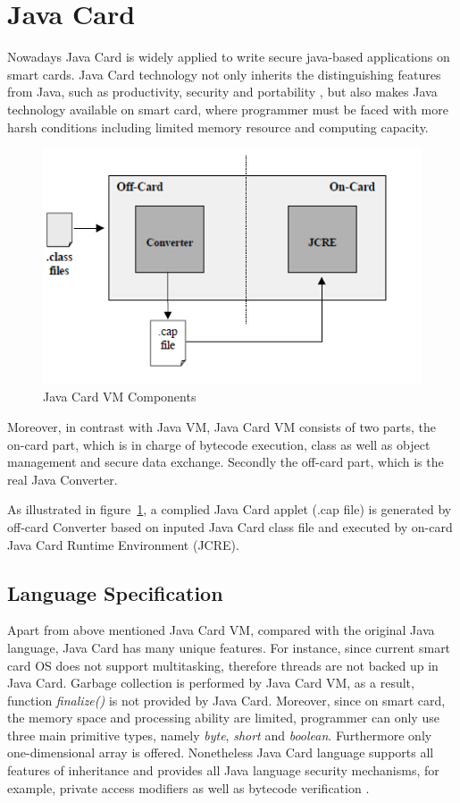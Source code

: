 \section{Java Card} \label{secJAVACARD}
Nowadays Java Card is widely applied to write secure java-based applications on smart cards. Java Card technology not only inherits the distinguishing features from Java, such as productivity, security and portability \cite{jcadg}, but also makes Java technology available on smart card, where programmer must be faced with more harsh conditions including limited memory resource and computing capacity.

 \begin{figure}[!htb]
	\centering
	\includegraphics[width=1\textwidth]{jcvm.jpg}
		\caption{Java Card VM Components\cite{jcadg}}
	\label{fig:jcvm}
\end{figure}

Moreover, in contrast with Java VM, Java Card VM consists of two parts, the on-card part, which is in charge of bytecode execution, class as well as object management and secure data exchange. Secondly the off-card part, which is the real Java Converter.

As illustrated in figure~\ref{fig:jcvm}, a complied Java Card applet (.cap file) is generated by off-card Converter based on inputed Java Card class file and executed by on-card Java Card Runtime Environment (JCRE). 





\subsection{Language Specification}
Apart from above mentioned Java Card VM, compared with the original Java language, Java Card has many unique features. For instance,
since current smart card OS does not support multitasking, therefore threads are not backed up in Java Card. Garbage collection is performed by Java Card VM, as a result, function \emph{finalize()} is not provided by Java Card. Moreover, since on smart card, the memory space and processing ability are limited, programmer can only use three main primitive types, namely \emph{byte}, \emph{short} and \emph{boolean}. Furthermore only one-dimensional array is offered. Nonetheless Java Card language supports all features of inheritance and provides all Java language security mechanisms, for example, private access modifiers as well as bytecode verification \cite{jcadg}.

